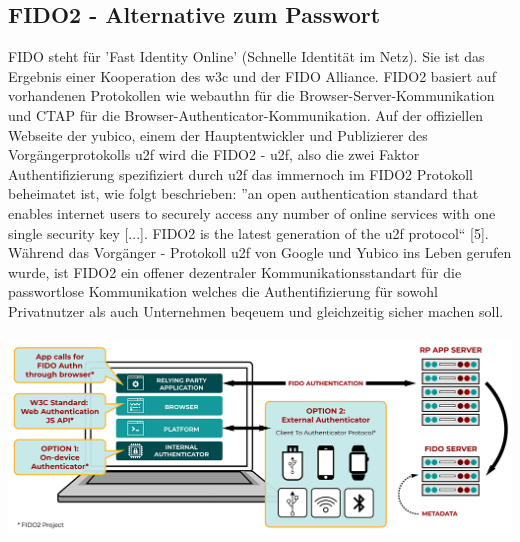 \subsection{FIDO2 - Alternative zum Passwort}
FIDO steht für 'Fast Identity Online' (Schnelle Identität im Netz). Sie ist das Ergebnis einer Kooperation des \ac{w3c} und der FIDO Alliance. FIDO2 basiert auf vorhandenen Protokollen wie \ac{webauthn} für die Browser-Server-Kommunikation und CTAP für die Browser-Authenticator-Kommunikation. Auf der offiziellen Webseite der yubico, einem der Hauptentwickler und Publizierer des Vorgängerprotokolls \ac{u2f} wird die FIDO2 - \ac{u2f}, also die zwei Faktor Authentifizierung spezifiziert durch \ac{u2f} das immernoch im FIDO2 Protokoll beheimatet ist, wie folgt beschrieben: ''an open authentication standard that enables internet users to securely access any number of online services with one single security key [...]. FIDO2 is the latest generation of the \ac{u2f} protocol`` [5]. Während das Vorgänger - Protokoll \ac{u2f} von Google und Yubico ins Leben gerufen wurde, ist FIDO2 ein offener dezentraler Kommunikationsstandart für die passwortlose Kommunikation welches die Authentifizierung für sowohl Privatnutzer als auch Unternehmen beqeuem und gleichzeitig sicher machen soll. \\ \\
\includegraphics[width=15cm]{Graphics/FIDO2-Graphic-v2.png} \\
\\
